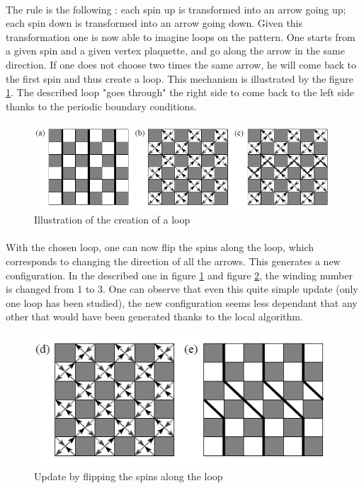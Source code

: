 \documentclass[a4paper,12pt,twoside]{article}
\begin{document}
	\paragraph{} The rule is the following : each spin up is transformed into an arrow going up; each spin down is transformed into an arrow going down. 
	Given this transformation one is now able to imagine loops on the pattern. One starts from a given spin and a given vertex plaquette, and go along the arrow in the same direction. If one does not choose two times the same arrow, he will come back to the first spin and thus create a loop. This mechanism is illustrated by the figure \ref{creating_loop}. The described loop "goes through" the right side to come back to the left side thanks to the periodic boundary conditions.
	\begin{figure}[!h]
		\centering
		\includegraphics[]{creating_loop.png}
		\caption{Illustration of the creation of a loop}
		\label{creating_loop}
	\end{figure}

	\paragraph{}
	With the chosen loop, one can now flip the spins along the loop, which corresponds to changing the direction of all the arrows. This generates a new configuration. In the described one in figure \ref{creating_loop} and figure \ref{loop_update}, the winding number is changed from 1 to 3. One can observe that even this quite simple update (only one loop has been studied), the new configuration seems less dependant that any other that would have been generated thanks to the local algorithm. 
	\begin{figure}[!h]
		\centering
		\includegraphics[]{loop_update.png}
		\caption{Update by flipping the spins along the loop}
		\label{loop_update}
	\end{figure}
\end{document}
